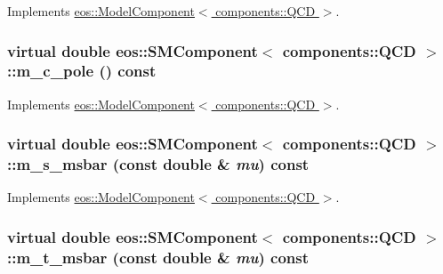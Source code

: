 Implements \hyperlink{classeos_1_1ModelComponent_3_01components_1_1QCD_01_4_a82e6a460fe4fb848928fe6952fd56bb1}{eos::ModelComponent$<$ components::QCD $>$}.\hypertarget{classeos_1_1SMComponent_3_01components_1_1QCD_01_4_a013ddfb77a30fe05fd3593c1528331b0}{
\subsubsection[{m\_\-c\_\-pole}]{\setlength{\rightskip}{0pt plus 5cm}virtual double eos::SMComponent$<$ components::QCD $>$::m\_\-c\_\-pole () const}}
\label{classeos_1_1SMComponent_3_01components_1_1QCD_01_4_a013ddfb77a30fe05fd3593c1528331b0}


Implements \hyperlink{classeos_1_1ModelComponent_3_01components_1_1QCD_01_4_a3a2c090cf0f7099c471fd4cc413431e3}{eos::ModelComponent$<$ components::QCD $>$}.\hypertarget{classeos_1_1SMComponent_3_01components_1_1QCD_01_4_a0d31a7565a92e0dca81e153932690945}{
\subsubsection[{m\_\-s\_\-msbar}]{\setlength{\rightskip}{0pt plus 5cm}virtual double eos::SMComponent$<$ components::QCD $>$::m\_\-s\_\-msbar (const double \& {\em mu}) const}}
\label{classeos_1_1SMComponent_3_01components_1_1QCD_01_4_a0d31a7565a92e0dca81e153932690945}


Implements \hyperlink{classeos_1_1ModelComponent_3_01components_1_1QCD_01_4_ac93d5c86dbb1e6118ab972e8c0f6bc12}{eos::ModelComponent$<$ components::QCD $>$}.\hypertarget{classeos_1_1SMComponent_3_01components_1_1QCD_01_4_a6bda92aac898c86185a8f3fca6f575cf}{
\subsubsection[{m\_\-t\_\-msbar}]{\setlength{\rightskip}{0pt plus 5cm}virtual double eos::SMComponent$<$ components::QCD $>$::m\_\-t\_\-msbar (const double \& {\em mu}) const}}
\label{classeos_1_1SMComponent_3_01components_1_1QCD_01_4_a6bda92aac898c86185a8f3fca6f575cf}


